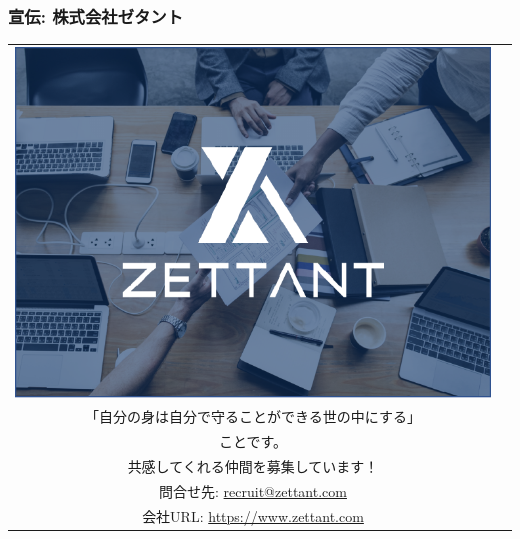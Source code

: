 \begin{frame}
\frametitle{宣伝: 株式会社ゼタント}
\begin{tabular}{cc}
\begin{minipage}[b]{0.3\linewidth}
\includegraphics[width=\linewidth]{FigsZettant/logo.pdf}
\vspace{1ex}
\end{minipage}
 & 
\begin{minipage}[b]{0.7\linewidth}
\footnotesize
ゼタントはのミッションは、\\

「自分の身は自分で守ることができる世の中にする」\\

ことです。\\
共感してくれる仲間を募集しています！\\

問合せ先: \url{recruit@zettant.com}\\
会社URL: \url{https://www.zettant.com}
\end{minipage}
\end{tabular}
\end{frame}
